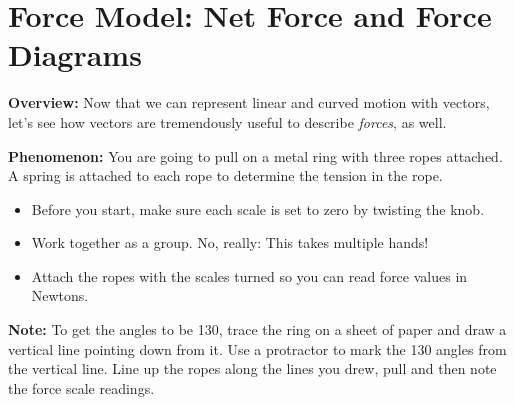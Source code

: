 \section[Force Model: Net Force and Force Diagrams]{Force Model: Net Force and Force Diagrams}
\label{act6.2.1}

\begin{overview}

\textbf{Overview:} Now that we can represent linear and curved motion with vectors, let's see how vectors are tremendously useful to describe \emph{forces}, as well.

\end{overview}

\noindent\textbf{Phenomenon:} You are going to pull on a metal ring with three ropes attached. A spring is attached to each rope to determine the tension in the rope.

\begin{itemize}
	\item Before you start, make sure each scale is set to zero by twisting the knob.
	\item Work together as a group. No, really: This takes multiple hands!
	\item Attach the ropes with the scales turned so you can read force values in Newtons.
\end{itemize}

\noindent\textbf{Note:} To get the angles to be 130\textdegree{}, trace the ring on a sheet of paper and draw a vertical line pointing down from it. Use a protractor to mark the 130\textdegree{} angles from the vertical line. Line up the ropes along the lines you drew, pull and then note the force scale readings.

